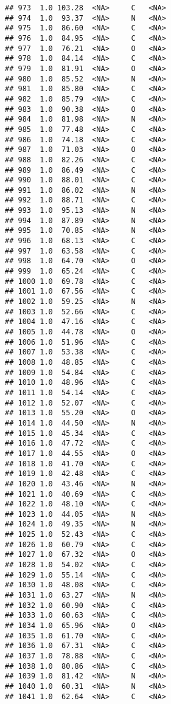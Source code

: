 \documentclass[
]{article}
\begin{document}
\begin{verbatim}
## 973  1.0 103.28  <NA>     C   <NA>
## 974  1.0  93.37  <NA>     N   <NA>
## 975  1.0  86.60  <NA>     C   <NA>
## 976  1.0  84.95  <NA>     C   <NA>
## 977  1.0  76.21  <NA>     O   <NA>
## 978  1.0  84.14  <NA>     C   <NA>
## 979  1.0  81.91  <NA>     O   <NA>
## 980  1.0  85.52  <NA>     N   <NA>
## 981  1.0  85.80  <NA>     C   <NA>
## 982  1.0  85.79  <NA>     C   <NA>
## 983  1.0  90.38  <NA>     O   <NA>
## 984  1.0  81.98  <NA>     N   <NA>
## 985  1.0  77.48  <NA>     C   <NA>
## 986  1.0  74.18  <NA>     C   <NA>
## 987  1.0  71.03  <NA>     O   <NA>
## 988  1.0  82.26  <NA>     C   <NA>
## 989  1.0  86.49  <NA>     C   <NA>
## 990  1.0  88.01  <NA>     C   <NA>
## 991  1.0  86.02  <NA>     N   <NA>
## 992  1.0  88.71  <NA>     C   <NA>
## 993  1.0  95.13  <NA>     N   <NA>
## 994  1.0  87.89  <NA>     N   <NA>
## 995  1.0  70.85  <NA>     N   <NA>
## 996  1.0  68.13  <NA>     C   <NA>
## 997  1.0  63.58  <NA>     C   <NA>
## 998  1.0  64.70  <NA>     O   <NA>
## 999  1.0  65.24  <NA>     C   <NA>
## 1000 1.0  69.78  <NA>     C   <NA>
## 1001 1.0  67.56  <NA>     C   <NA>
## 1002 1.0  59.25  <NA>     N   <NA>
## 1003 1.0  52.66  <NA>     C   <NA>
## 1004 1.0  47.16  <NA>     C   <NA>
## 1005 1.0  44.78  <NA>     O   <NA>
## 1006 1.0  51.96  <NA>     C   <NA>
## 1007 1.0  53.38  <NA>     C   <NA>
## 1008 1.0  48.85  <NA>     C   <NA>
## 1009 1.0  54.84  <NA>     C   <NA>
## 1010 1.0  48.96  <NA>     C   <NA>
## 1011 1.0  54.14  <NA>     C   <NA>
## 1012 1.0  52.07  <NA>     C   <NA>
## 1013 1.0  55.20  <NA>     O   <NA>
## 1014 1.0  44.50  <NA>     N   <NA>
## 1015 1.0  45.34  <NA>     C   <NA>
## 1016 1.0  47.72  <NA>     C   <NA>
## 1017 1.0  44.55  <NA>     O   <NA>
## 1018 1.0  41.70  <NA>     C   <NA>
## 1019 1.0  42.48  <NA>     C   <NA>
## 1020 1.0  43.46  <NA>     N   <NA>
## 1021 1.0  40.69  <NA>     C   <NA>
## 1022 1.0  48.10  <NA>     C   <NA>
## 1023 1.0  44.05  <NA>     N   <NA>
## 1024 1.0  49.35  <NA>     N   <NA>
## 1025 1.0  52.43  <NA>     C   <NA>
## 1026 1.0  60.79  <NA>     C   <NA>
## 1027 1.0  67.32  <NA>     O   <NA>
## 1028 1.0  54.02  <NA>     C   <NA>
## 1029 1.0  55.14  <NA>     C   <NA>
## 1030 1.0  48.08  <NA>     C   <NA>
## 1031 1.0  63.27  <NA>     N   <NA>
## 1032 1.0  60.90  <NA>     C   <NA>
## 1033 1.0  60.63  <NA>     C   <NA>
## 1034 1.0  65.96  <NA>     O   <NA>
## 1035 1.0  61.70  <NA>     C   <NA>
## 1036 1.0  67.31  <NA>     C   <NA>
## 1037 1.0  78.88  <NA>     C   <NA>
## 1038 1.0  80.86  <NA>     C   <NA>
## 1039 1.0  81.42  <NA>     N   <NA>
## 1040 1.0  60.31  <NA>     N   <NA>
## 1041 1.0  62.64  <NA>     C   <NA>

\end{verbatim}
\end{document}
